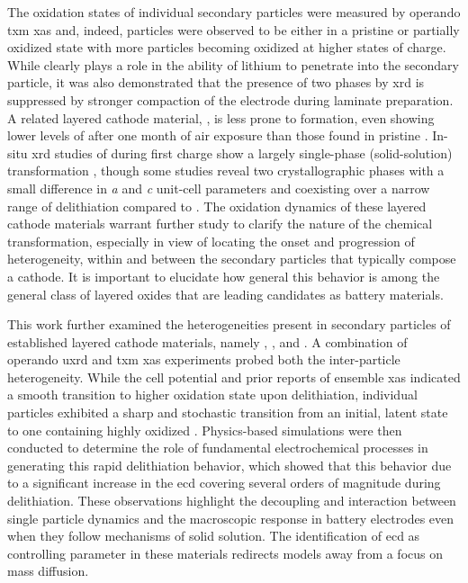 \documentclass{article}
\begin{document}
The oxidation states of individual secondary particles were measured
by operando \gls{txm} \gls{xas} and, indeed, particles were observed
to be either in a pristine or partially oxidized state with more
particles becoming oxidized at higher states of
charge\cite{nowack2016}. While  clearly plays a role in the
ability of lithium to penetrate into the secondary particle, it was
also demonstrated that the presence of two phases by \gls{xrd} is
suppressed by stronger compaction of the electrode during laminate
preparation\cite{bobrikov2018}. A related layered cathode material,
\nmc[333]{}, is less prone to  formation, even showing
lower levels of  after one month of air exposure than those
found in pristine \nca{}\cite{shizuka2007}. In-situ \gls{xrd} studies
of \nmc[333]{} during first charge show a largely single-phase
(solid-solution) transformation \cite{hulzen2018,ahn2017,zhou2016-2},
though some studies reveal two crystallographic phases with a small
difference in \emph{a} and \emph{c} unit-cell parameters and
coexisting over a narrow range of delithiation compared to
\nca{}\cite{yoon2006,hua2018}. The oxidation dynamics of these layered
cathode materials warrant further study to clarify the nature of the
chemical transformation, especially in view of locating the onset and
progression of heterogeneity, within and between the secondary
particles that typically compose a cathode. It is important to
elucidate how general this behavior is among the general class of
layered oxides that are leading candidates as battery materials.

This work further examined the heterogeneities present in secondary
particles of established layered cathode materials, namely \nca{},
\nmc[333]{}, and \nmc[532]{}. A combination of operando \gls{uxrd} and
\gls{txm} \gls{xas} experiments probed both the inter-particle
heterogeneity. While the cell potential and prior reports of ensemble
\gls{xas} indicated a smooth transition to higher oxidation state upon
delithiation\cite{deb2005,muto2009}, individual particles exhibited a
sharp and stochastic transition from an initial, latent state to one
containing highly oxidized . Physics-based simulations were
then conducted to determine the role of fundamental electrochemical
processes in generating this rapid delithiation behavior, which showed
that this behavior due to a significant increase in the \gls{ecd}
covering several orders of magnitude during delithiation. These
observations highlight the decoupling and interaction between single
particle dynamics and the macroscopic response in battery electrodes
even when they follow mechanisms of solid solution. The identification
of \gls{ecd} as controlling parameter in these materials redirects
models away from a focus on mass diffusion.
\end{document}

